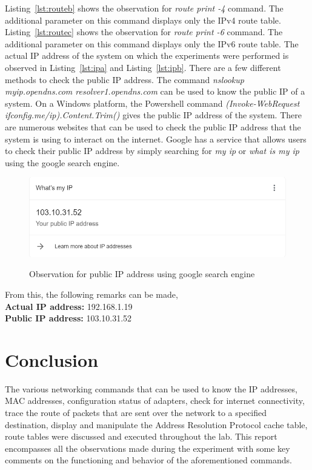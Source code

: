 \documentclass{lab_sheet}
\begin{document}
    Listing~\ref{lst:routeb} shows the observation for \textit{route print -4} command. The additional parameter on this command displays only the IPv4 route table.
    Listing~\ref{lst:routec} shows the observation for \textit{route print -6} command. The additional parameter on this command displays only the IPv6 route table.
    The actual IP address of the system on which the experiments were performed is observed in Listing~\ref{lst:ipa} and Listing~\ref{lst:ipb}.
    There are a few different methods to check the public IP address. 
    The command \textit{nslookup myip.opendns.com resolver1.opendns.com} can be used to know the public IP of a system.
    On a Windows platform, the Powershell command \textit{(Invoke-WebRequest ifconfig.me/ip).Content.Trim()} gives the public IP address of the system.
    There are numerous websites that can be used to check the public IP address that the system is using to interact on the internet. Google has a service that allows users to check their public IP address by simply searching for \textit{my ip} or \textit{what is my ip} using the google search engine.
    \begin{figure}[H]
        \centering
        \includegraphics[scale=0.8,frame]{./Figures/publicip.png}
        \label{fig:publicip}
        \caption{Observation for public IP address using google search engine}
    \end{figure}
    From this, the following remarks can be made,\\
    \textbf{Actual IP address:} 192.168.1.19\\
    \textbf{Public IP address:} 103.10.31.52
    \section{Conclusion}
    The various networking commands that can be used to know the IP addresses, MAC addresses, configuration status of adapters, check for internet connectivity, trace the route of packets that are sent over the network to a specified destination, display and manipulate the Address Resolution Protocol cache table, route tables were discussed and executed throughout the lab. This report encompasses all the observations made during the experiment with some key comments on the functioning and behavior of the aforementioned commands.
\end{document}
